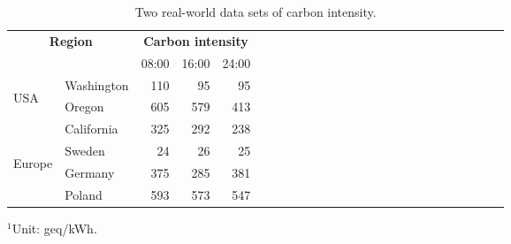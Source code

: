 \documentclass[conference, 10pt, ﬁnal, letterpaper, twocolumn]{IEEEtran}
\begin{document}
\begin{table}[h]
    \caption{\label{tab:data}Two real-world data sets of carbon intensity.}
    \begin{center}
        \begin{threeparttable}[b]
            \begin{tabular}{*{5}{llrrr}}
                \toprule
                \midrule
                 \multicolumn{2}{c}{\multirow{2}{*}{\bf Region}} & \multicolumn{3}{c}{\bf Carbon intensity\tnote{1}}\\
                 \cmidrule(lr){3-5}
                \multicolumn{2}{c}{} & 08:00 & 16:00 & 24:00 \\
                \midrule
                 \multirow{3}{*}{\begin{turn}{90} USA \end{turn}} & Washington & 110 & 95  & 95\\
                 & Oregon & 605 & 579 & 413\\
                 & California & 325 & 292  & 238\\
                \midrule
                 \multirow{3}{*}{\begin{turn}{90} Europe \end{turn}} & Sweden & 24 & 26 & 25\\
                 & Germany & 375 & 285 & 381\\
                 & Poland & 593 & 573 & 547\\
                \midrule
                \bottomrule
            \end{tabular}
            
            \begin{tablenotes}
            	\footnotesize
            	\item $^1$Unit: geq/kWh.
            \end{tablenotes}
        \end{threeparttable}
    \end{center}
\end{table}
\end{document}
